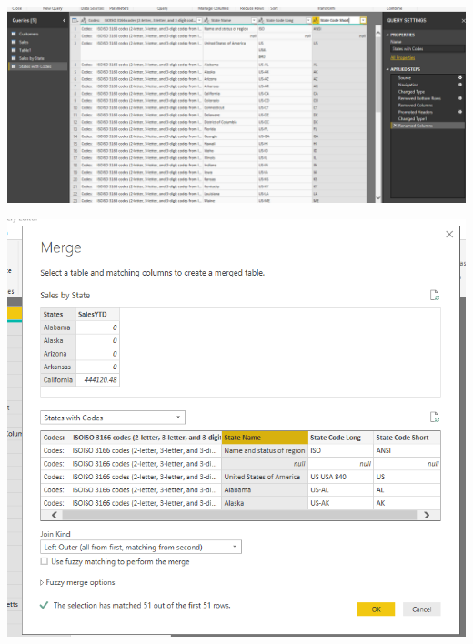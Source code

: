 	\begin{center}
	\includegraphics[width=15cm]{./Imagenes/Imagen10}
	\end{center}	
\newpage
	\begin{center}
	\includegraphics[width=15cm]{./Imagenes/Imagen11}
	\end{center}	


